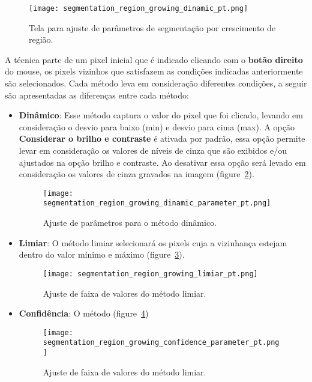 \begin{figure}[!htb]
\centering
\texttt{[image: segmentation\_region\_growing\_dinamic\_pt.png]}
\caption{Tela para ajuste de parâmetros de segmentação por crescimento de região.}
\label{fig:segmentation_region_growing_dinamic}
\end{figure}

A técnica parte de um pixel inicial que é indicado clicando com o \textbf{botão direito} do mouse, os pixels vizinhos que satisfazem as condições indicadas anteriormente são selecionados. Cada método leva em consideração diferentes condições, a seguir são apresentadas as diferenças entre cada método:

\begin{itemize}
	\item \textbf{Dinâmico}: Esse método captura o valor do pixel que foi clicado, levando em consideração o desvio para baixo (min) e desvio para cima (max). A opção \textbf{Considerar o brilho e contraste} é ativada por padrão, essa opção permite levar em consideração os valores de níveis de cinza que são exibidos e/ou ajustados na opção brilho e contraste. Ao desativar essa opção será levado em consideração os valores de cinza gravados na imagem (figure~\ref{fig:segmentation_region_growing_dinamic_parameter}). 
	
	\begin{figure}[!htb]
	\centering
	\texttt{[image: segmentation\_region\_growing\_dinamic\_parameter\_pt.png]}
	\caption{Ajuste de parâmetros para o método dinâmico.}
	\label{fig:segmentation_region_growing_dinamic_parameter}
	\end{figure}
	
	\item \textbf{Limiar}: O método limiar selecionará os pixels cuja a vizinhança estejam dentro do valor mínimo e máximo (figure~\ref{fig:segmentation_region_growing_limiar}).

	\begin{figure}[!htb]
	\centering
	\texttt{[image: segmentation\_region\_growing\_limiar\_pt.png]}
	\caption{Ajuste de faixa de valores do método limiar.}
	\label{fig:segmentation_region_growing_limiar}
	\end{figure}	
	
	\item \textbf{Confidência}: O método (figure~\ref{fig:segmentation_region_growing_confidence_parameter})
	
	\begin{figure}[!htb]
	\centering
	\texttt{[image: segmentation\_region\_growing\_confidence\_parameter\_pt.png]}
	\caption{Ajuste de faixa de valores do método limiar.}
	\label{fig:segmentation_region_growing_confidence_parameter}
	\end{figure}	
	
	
\end{itemize}
